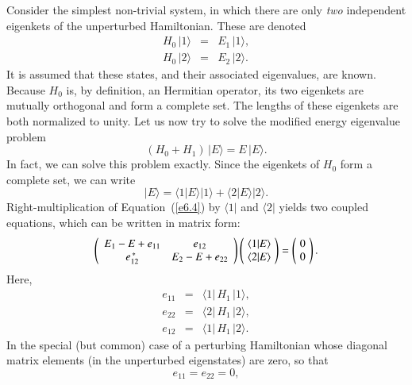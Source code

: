 Consider the simplest non-trivial system, in which there are only {\em two}\/ 
independent  eigenkets of the unperturbed Hamiltonian. These are denoted
\begin{eqnarray}
H_0 \,|1\rangle &=& E_1 \,|1\rangle,\\[0.5ex]
H_0 \,|2\rangle &=& E_2 \,|2\rangle.
\end{eqnarray}
It is assumed that these states, and their associated eigenvalues, are known.
Because $H_0$ is, by definition,  an Hermitian operator,
 its two eigenkets are mutually orthogonal 
and form a complete set. The lengths of these
eigenkets are both normalized to unity. 
Let us now try to solve the modified energy eigenvalue problem
\begin{equation}\label{e6.4}
(H_0 + H_1) \,|E\rangle = E\,|E\rangle.
\end{equation}
In fact, we can solve this problem exactly. Since the eigenkets of $H_0$ form a
complete set, we can write
\begin{equation}
|E\rangle = \langle 1|E\rangle |1\rangle  + \langle 2|E\rangle |2\rangle.
\end{equation}
Right-multiplication of  Equation~(\ref{e6.4}) by $\langle 1|$ and $\langle 2|$ yields two
coupled equations, which can be written in matrix form:
\begin{equation}\label{e6.6}
\left( \begin{array}{c c}
E_1 -E + e_{11}   & e_{12} \\
e_{12}^{\,\ast} & E_2 -E + e_{22} 
\end{array} \right)\left(\!
\begin{array}{c}\langle 1|E\rangle\\
\langle 2|E \rangle\end{array}
\!\right)= \left(\!\begin{array}{c}0\\
0 \end{array}\!
\right).
\end{equation}
Here,
\begin{eqnarray}
e_{11} &=& \langle 1|\,H_1\, | 1\rangle,\\[0.5ex]
e_{22} &=& \langle 2 |\,H_1\, |2\rangle, \\[0.5ex]
e_{12} &=& \langle 1|\,H_1\,|2\rangle.
\end{eqnarray}
In the special (but common) case of a perturbing Hamiltonian whose diagonal
matrix elements (in the unperturbed eigenstates) are zero, so that
\begin{equation}
e_{11} = e_{22} = 0,
\end{equation}
